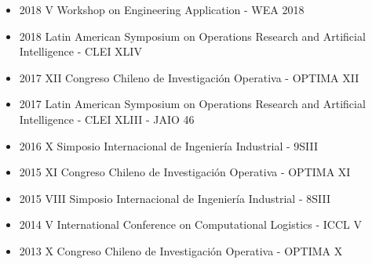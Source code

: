 {\begin{itemize}
    \item 2018 V Workshop on Engineering Application - WEA 2018
    \item 2018 Latin American Symposium on Operations Research and Artificial Intelligence - CLEI XLIV
    \item 2017 XII Congreso Chileno de Investigaci\'on Operativa - OPTIMA XII
    \item 2017 Latin American Symposium on Operations Research and Artificial Intelligence - CLEI XLIII - JAIO 46
    \item 2016 X Simposio Internacional de Ingenier\'ia Industrial - 9SIII
    \item 2015 XI Congreso Chileno de Investigaci\'on Operativa - OPTIMA XI
    \item 2015 VIII Simposio Internacional de Ingenier\'ia Industrial - 8SIII
    \item 2014 V International Conference on Computational Logistics - ICCL V
    \item 2013 X Congreso Chileno de Investigaci\'on Operativa - OPTIMA X
\end{itemize}
}

\clearpage
